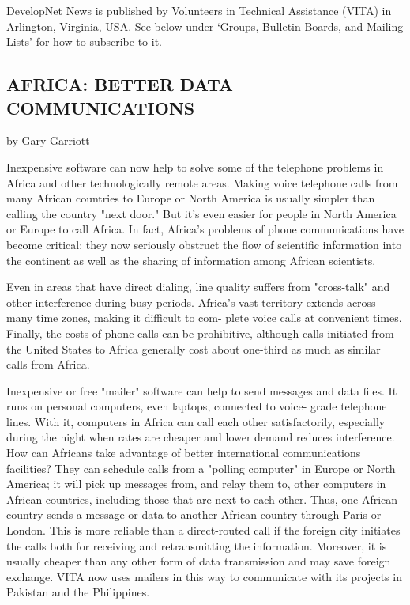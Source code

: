 DevelopNet News is published by Volunteers in Technical Assistance
(VITA) in Arlington, Virginia, USA.
See below under `Groups, Bulletin Boards,
and Mailing Lists' for how to subscribe to it.

\subsection{AFRICA: BETTER DATA COMMUNICATIONS}
 
by Gary Garriott
 
Inexpensive software can now help to solve some of the telephone
problems in Africa and other technologically remote areas.  Making
voice telephone calls from many African countries to Europe or North
America is usually simpler than calling the country "next door." But
it's even easier for people in North America or Europe to call Africa.
In fact, Africa's problems of phone communications have become
critical: they now seriously obstruct the flow of scientific
information into the continent as well as the sharing of information
among African scientists.

 Even in areas that have direct dialing, line quality suffers from
"cross-talk" and other interference during busy periods. Africa's vast
territory extends across many time zones, making it difficult to com-
plete voice calls at convenient times. Finally, the costs of phone calls
can be prohibitive, although calls initiated from the United States to
Africa generally cost about one-third as much as similar calls from
Africa.

 Inexpensive or free "mailer" software can help to send messages and data
files. It runs on personal computers, even laptops, connected to voice-
grade telephone lines. With it, computers in Africa can call each other
satisfactorily, especially during the night when rates are cheaper and
lower demand reduces interference.
 How can Africans take advantage of better international communications
facilities? They can schedule calls from a "polling computer" in Europe
or North America; it will pick up messages from, and relay them to,
other computers in African countries, including those that are next to
each other. Thus, one African country sends a message or data to another
African country through Paris or London. This is more reliable than a
direct-routed call if the foreign city initiates the calls both for
receiving and retransmitting the information. Moreover, it is usually
cheaper than any other form of data transmission and may save foreign
exchange. VITA now uses mailers in this way to communicate with its
projects in Pakistan and the Philippines.
 
